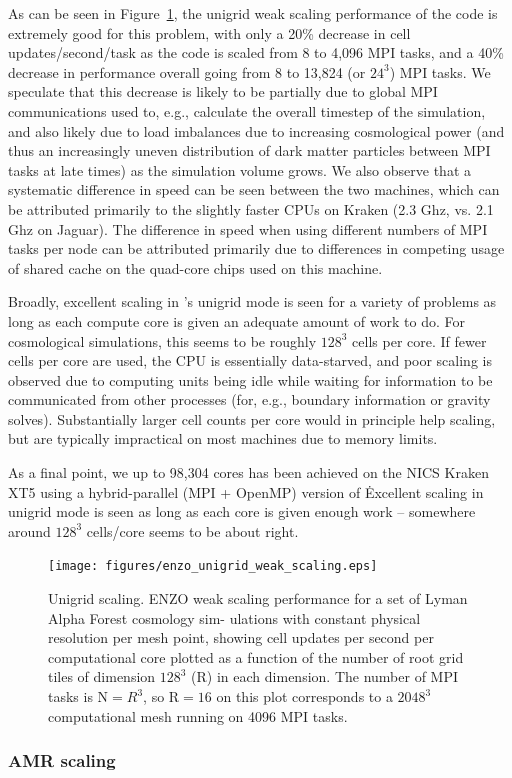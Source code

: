 As can be seen in Figure~\ref{fig.uniscale}, the unigrid weak scaling
performance of the code is extremely good for this problem, with only
a 20\% decrease in cell updates/second/task as the code is scaled from
8 to 4,096 MPI tasks, and a 40\% decrease in performance overall going
from 8 to 13,824 (or $24^3$) MPI tasks.  We speculate that this
decrease is likely to be partially due to global MPI communications
used to, e.g., calculate the overall timestep of the simulation, and
also likely due to load imbalances due to increasing cosmological
power (and thus an increasingly uneven distribution of dark matter
particles between MPI tasks at late times) as the simulation volume
grows.  We also observe that a systematic difference in speed can be
seen between the two machines, which can be attributed primarily to
the slightly faster CPUs on Kraken (2.3 Ghz, vs. 2.1 Ghz on Jaguar).
The difference in speed when using different numbers of MPI tasks per
node can be attributed primarily due to differences in competing usage
of shared cache on the quad-core chips used on this machine.

Broadly, excellent scaling in \enzo's unigrid
mode is seen for a variety of problems as long as each compute core is
given an adequate amount of work to do.  For cosmological simulations, this seems to be
roughly $128^3$ cells per core.  If fewer cells per core are used, the
CPU is essentially data-starved, and poor scaling is observed due to
computing units being idle while waiting for information to be
communicated from other processes (for, e.g., boundary information or
gravity solves).  Substantially larger cell counts per core  would in
principle help scaling, but are typically impractical on
most machines due to memory limits.

As a final point, we 
up to 98,304
cores has been achieved on the NICS Kraken XT5 using a hybrid-parallel
(MPI + OpenMP)
version of \enzo\.  Excellent scaling in unigrid mode is seen as long
as each core is given enough work -- somewhere around $128^3$
cells/core seems to be about right.

\begin{figure}
\begin{center}
\texttt{[image: figures/enzo\_unigrid\_weak\_scaling.eps]}
\caption{Unigrid scaling.  ENZO weak scaling performance for a set of
  Lyman Alpha Forest cosmology sim- ulations with constant physical
  resolution per mesh point, showing cell updates per second per
  computational core plotted as a function of the number of root grid
  tiles of dimension $128^3$ (R) in each dimension. The number of MPI
  tasks is N$ = R^3$, so R$ = 16$ on this plot corresponds to a $2048^3$ computational mesh running on 4096 MPI tasks. }
\label{fig.uniscale}
\end{center}
\end{figure}

\subsubsection{AMR scaling }


